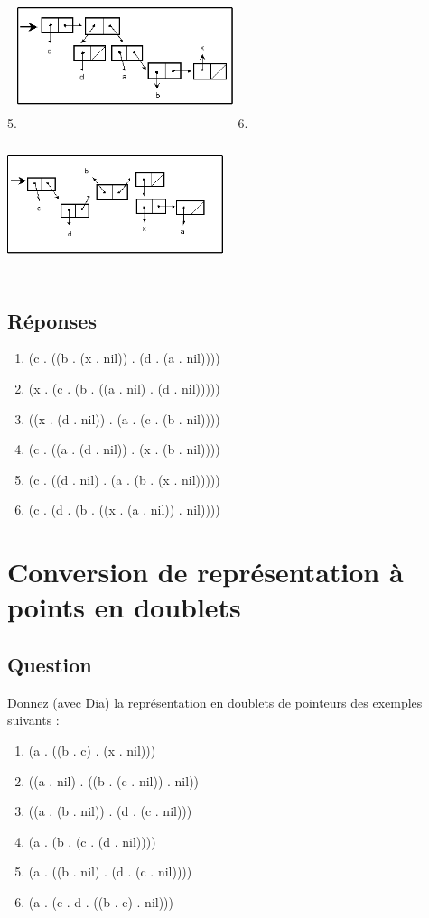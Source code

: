 \documentclass[a4paper, 11pt]{article}
\begin{document}
5.\includegraphics[height=120pt, width=180pt]{Pointeurs_Exo5.png}  6.\includegraphics[height=120pt, width=180pt]{Pointeurs_Exo6.png}\\

\subsection{Réponses}
\begin{enumerate}
    \item (c . ((b . (x . nil)) . (d . (a . nil))))
    \item (x . (c . (b . ((a . nil) . (d . nil)))))
    \item ((x . (d . nil)) . (a . (c . (b . nil))))
    \item (c . ((a . (d . nil)) . (x . (b . nil))))
    \item (c . ((d . nil) . (a . (b . (x . nil)))))
    \item (c . (d . (b . ((x . (a . nil)) . nil))))
\end{enumerate}

\section{Conversion de représentation à points en doublets}
\subsection{Question}
 Donnez (avec Dia) la représentation en doublets de pointeurs des exemples suivants :
\begin{enumerate}
    \item (a . ((b . c) . (x . nil)))
    \item ((a . nil) . ((b . (c . nil)) . nil))
    \item ((a . (b . nil)) . (d . (c . nil)))
    \item (a . (b . (c . (d . nil))))
    \item (a . ((b . nil) . (d . (c . nil))))
    \item (a . (c . d . ((b . e) . nil)))
\end{enumerate}
\end{document}

